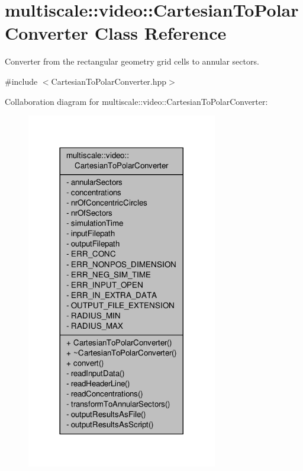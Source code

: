 \hypertarget{classmultiscale_1_1video_1_1CartesianToPolarConverter}{\section{multiscale\-:\-:video\-:\-:Cartesian\-To\-Polar\-Converter Class Reference}
\label{classmultiscale_1_1video_1_1CartesianToPolarConverter}
}


Converter from the rectangular geometry grid cells to annular sectors.  




{\ttfamily \#include $<$Cartesian\-To\-Polar\-Converter.\-hpp$>$}



Collaboration diagram for multiscale\-:\-:video\-:\-:Cartesian\-To\-Polar\-Converter\-:
\nopagebreak
\begin{figure}[H]
\begin{center}
\leavevmode
\includegraphics[width=236pt]{classmultiscale_1_1video_1_1CartesianToPolarConverter__coll__graph}
\end{center}
\end{figure}
